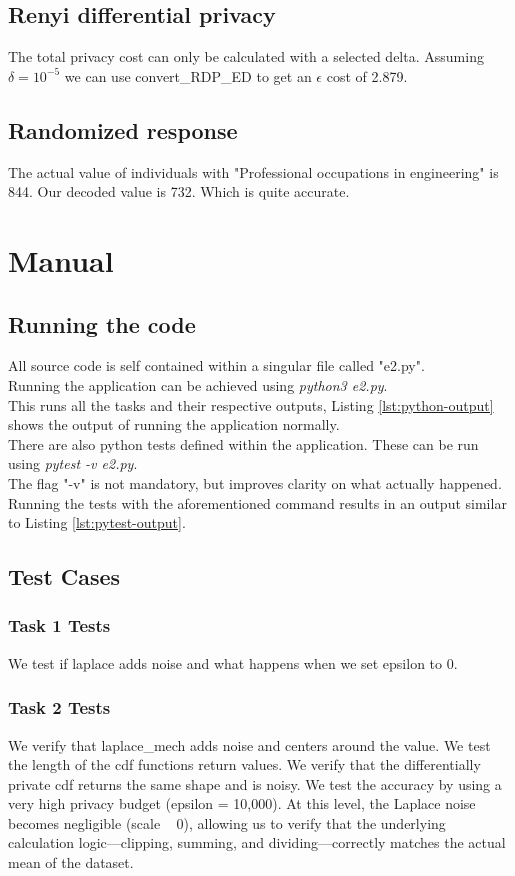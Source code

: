 \documentclass{article}
\begin{document}
		\subsection{Renyi differential privacy}
		The total privacy cost can only be calculated with a selected delta. Assuming $\delta = 10^{-5}$ we can use convert\_RDP\_ED to get an $\epsilon$ cost of 2.879.
		\subsection{Randomized response}
		The actual value of individuals with "Professional occupations in engineering" is 844. Our decoded value is 732.  Which is quite accurate.
	
	\section{Manual}
		\subsection{Running the code}
		All source code is self contained within a singular file called "e2.py".\\
		Running the application can be achieved using \textit{python3 e2.py}.\\
		This runs all the tasks and their respective outputs, Listing \ref{lst:python-output} shows the output of running the application normally.\\
		There are also python tests defined within the application. These can be run using \textit{pytest -v e2.py}.\\
		The flag "-v" is not mandatory, but improves clarity on what actually happened.\\
		Running the tests with the aforementioned command results in an output similar to Listing \ref{lst:pytest-output}.
		
		\subsection{Test Cases}
	
		\subsubsection{Task 1 Tests}
			We test if laplace adds noise and what happens when we set epsilon to 0.
		\subsubsection{Task 2 Tests}
			We verify that laplace\_mech adds noise and centers around the value. We test the length of the cdf functions return values.
			We verify that the differentially private cdf returns the same shape and is noisy.
			We test the accuracy by using a very high privacy budget (epsilon = 10,000). At this level, the Laplace noise becomes negligible (scale ~ 0), allowing us to verify that the underlying calculation logic—clipping, summing, and dividing—correctly matches the actual mean of the dataset.
\end{document}
